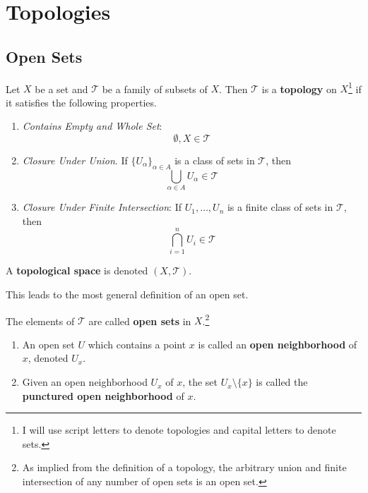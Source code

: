 \section{Topologies} 

  \subsection{Open Sets} 

    \begin{definition}[Topology]
      Let $X$ be a set and $\mathscr{T}$ be a family of subsets of $X$. Then $\mathscr{T}$ is a \textbf{topology} on $X$\footnote{I will use script letters to denote topologies and capital letters to denote sets.} if it satisfies the following properties. 
      \begin{enumerate}
        \item \textit{Contains Empty and Whole Set}: 
        \begin{equation}
          \emptyset, X \in \mathscr{T}
        \end{equation}

        \item \textit{Closure Under Union}. If $\{U_\alpha\}_{\alpha \in A}$ is a class of sets in $\mathscr{T}$, then 
        \begin{equation}
          \bigcup_{\alpha \in A} U_\alpha \in \mathscr{T}
        \end{equation}

        \item \textit{Closure Under Finite Intersection}: If $U_1, \ldots, U_n$ is a finite class of sets in $\mathscr{T}$, then 
        \begin{equation}
         \bigcap_{i=1}^{n} U_i \in \mathscr{T}
        \end{equation}
      \end{enumerate}
      A \textbf{topological space} is denoted $(X, \mathscr{T})$. 
    \end{definition}

    This leads to the most general definition of an open set. 

    \begin{definition}
      The elements of $\mathscr{T}$ are called \textbf{open sets} in $X$.\footnote{As implied from the definition of a topology, the arbitrary union and finite intersection of any number of open sets is an open set.} 
      \begin{enumerate}
        \item An open set $U$ which contains a point $x$ is called an \textbf{open neighborhood} of $x$, denoted $U_x$. 
        \item Given an open neighborhood $U_x$ of $x$, the set $U_x \setminus \{x\}$ is called the \textbf{punctured open neighborhood} of $x$. 
      \end{enumerate}
    \end{definition}

